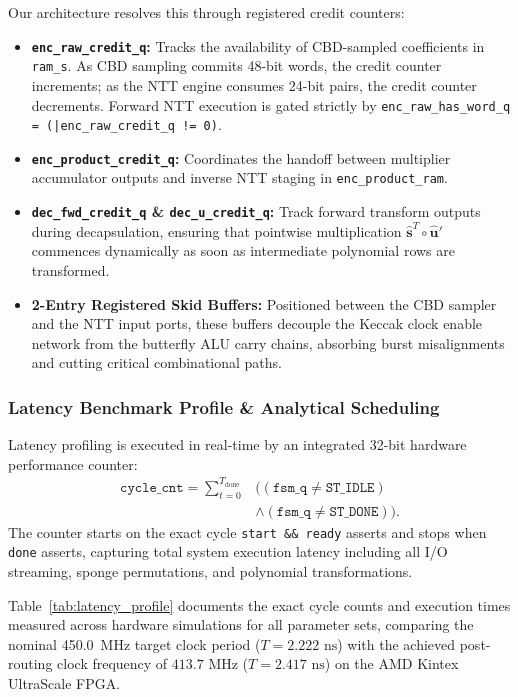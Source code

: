 Our architecture resolves this through registered credit counters:
\begin{itemize}
    \item \textbf{\texttt{enc\_raw\_credit\_q}:} Tracks the availability of CBD-sampled coefficients in \texttt{ram\_s}. As CBD sampling commits 48-bit words, the credit counter increments; as the NTT engine consumes 24-bit pairs, the credit counter decrements. Forward NTT execution is gated strictly by \texttt{enc\_raw\_has\_word\_q = (|enc\_raw\_credit\_q != 0)}.
    \item \textbf{\texttt{enc\_product\_credit\_q}:} Coordinates the handoff between multiplier accumulator outputs and inverse NTT staging in \texttt{enc\_product\_ram}.
    \item \textbf{\texttt{dec\_fwd\_credit\_q} \& \texttt{dec\_u\_credit\_q}:} Track forward transform outputs during decapsulation, ensuring that pointwise multiplication $\hat{\mathbf{s}}^T \circ \hat{\mathbf{u}}'$ commences dynamically as soon as intermediate polynomial rows are transformed.
    \item \textbf{2-Entry Registered Skid Buffers:} Positioned between the CBD sampler and the NTT input ports, these buffers decouple the Keccak clock enable network from the butterfly ALU carry chains, absorbing burst misalignments and cutting critical combinational paths.
\end{itemize}

\subsubsection{Latency Benchmark Profile \& Analytical Scheduling}
Latency profiling is executed in real-time by an integrated 32-bit hardware performance counter:
\begin{equation}
\label{eq:cycle_counter}
\begin{aligned}
\texttt{cycle\_cnt} = \sum_{t=0}^{T_{\text{done}}} &\big( (\texttt{fsm\_q} \neq \texttt{ST\_IDLE}) \\
&\land (\texttt{fsm\_q} \neq \texttt{ST\_DONE}) \big).
\end{aligned}
\end{equation}
The counter starts on the exact cycle \texttt{start \&\& ready} asserts and stops when \texttt{done} asserts, capturing total system execution latency including all I/O streaming, sponge permutations, and polynomial transformations.

Table~\ref{tab:latency_profile} documents the exact cycle counts and execution times measured across hardware simulations for all parameter sets, comparing the nominal 450.0~MHz target clock period ($T=2.222\text{ ns}$) with the achieved post-routing clock frequency of $413.7\text{ MHz}$ ($T=2.417\text{ ns}$) on the AMD Kintex UltraScale FPGA.

